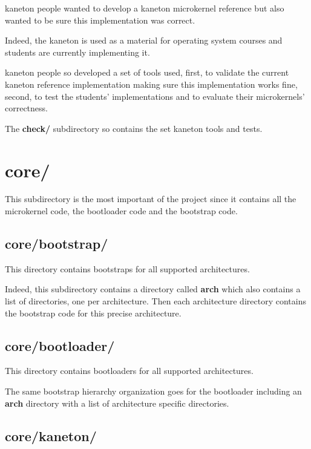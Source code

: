 kaneton people wanted to develop a kaneton microkernel reference but
also wanted to be sure this implementation was correct.

Indeed, the kaneton is used as a material for operating system courses and
students are currently implementing it.

kaneton people so developed a set of tools used, first, to validate the
current kaneton reference implementation making sure this implementation
works fine, second, to test the students' implementations and to evaluate
their microkernels' correctness.

The \textbf{check/} subdirectory so contains the set kaneton tools and tests.

%
%

\section{core/}

This subdirectory is the most important of the project since it contains
all the microkernel code, the bootloader code and the bootstrap code.

%
%

\subsection{core/bootstrap/}

This directory contains bootstraps for all supported architectures.

Indeed, this subdirectory contains a directory called \textbf{arch} which
also contains a list of directories, one per architecture. Then each
architecture directory contains the bootstrap code for this precise
architecture.

%
%

\subsection{core/bootloader/}

This directory contains bootloaders for all supported architectures.

The same bootstrap hierarchy organization goes for the bootloader
including an \textbf{arch} directory with a list of architecture
specific directories.

%
%

\subsection{core/kaneton/}

